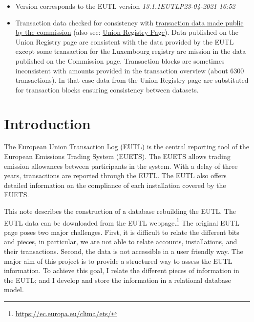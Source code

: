 \documentclass[authoryear]{elsarticle}
\begin{document}
\begin{itemize}
\begin{itemize}
			\item Version corresponds to the EUTL version \emph{13.1.1EUTLP23-04-2021 16:52}
			\item Transaction data checked for consistency with \href{https://ec.europa.eu/clima/sites/default/files/ets/registry/docs/transactions_eutl_2021.zip}{transaction data made public by the commission} (also see: \href{https://ec.europa.eu/clima/policies/ets/registry_en#tab-0-1}{Union Registry Page}). Data published on the Union Registry page are consistent with the data provided by the EUTL except some transaction for the Luxembourg registry are mission in the data published on the Commission page. Transaction blocks are sometimes inconsistent with amounts provided in the transaction overview (about 6300 transactions). In that case data from the Union Registry page are substituted for transaction blocks ensuring consistency between datasets.  			
		\end{itemize}
\end{itemize}



\section{Introduction}\label{sec:introduction}
The European Union Transaction Log (EUTL) is the central reporting tool of the European Emissions Trading System (EUETS). The EUETS allows trading emission allowances between participants in the system. With a delay of three years, transactions are reported through the EUTL. The EUTL also offers detailed information on the compliance of each installation covered by the EUETS. 
	
This note describes the construction of a database rebuilding the EUTL. The EUTL data can be downloaded from the EUTL webpage.\footnote{\url{https://ec.europa.eu/clima/ets/}} The original EUTL page poses two major challenges. First, it is difficult to relate the different bits and pieces, in particular, we are not able to relate accounts, installations, and their transactions. Second, the data is not accessible in a user friendly way. The major aim of this project is to provide a structured way to assess the EUTL information. To achieve this goal, I relate the different pieces of information in the EUTL; and I develop and store the information in a relational database model.
\end{document}
